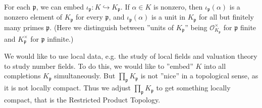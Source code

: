 \documentclass{article}
\theoremstyle{definition}
\begin{document}
For each $\mathfrak{p}$, we can embed $\iota_{\mathfrak{p}}: K \hookrightarrow K_{\mathfrak{p}}$. If $\alpha \in K$ is nonzero, then $\iota_{\mathfrak{p}}(\alpha)$ is a nonzero element of $K_{\mathfrak{p}}$ for every $\mathfrak{p}$, and $\iota_{\mathfrak{p}}(\alpha)$ is a unit in $K_{\mathfrak{p}}$ for all but finitely many primes $\mathfrak{p}$. (Here we distinguish between ''units of $K_{\mathfrak{p}}$'' being $\mathcal{O}_{K_{\mathfrak{p}}}^\times$ for $\mathfrak{p}$ finite and $K_{\mathfrak{p}}^\times$ for $\mathfrak{p}$ infinite.)
\vspace{1mm}
 
We would like to use local data, e.g. the study of local fields and valuation theory to study number fields. To do this, we would like to ''embed'' $K$ into all completions $K_{\mathfrak{p}}$ simultaneously. But $\prod_{\mathfrak{p}}^{} K_{\mathfrak{p}}$ is not ''nice'' in a topological sense, as it is not locally compact. Thus we adjust $\prod_{\mathfrak{p}}^{} K_{\mathfrak{p}}$ to get something locally compact, that is the Restricted Product Topology.
\end{document}
